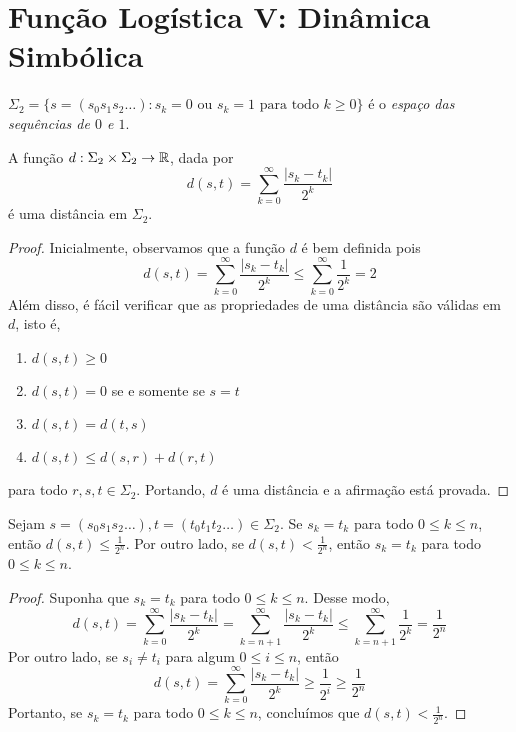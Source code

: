 \section{Função Logística V: Dinâmica Simbólica}

\begin{definition}
$\Sigma_2 = \{s = (s_0s_1s_2\dots) : s_k = 0 \textrm{ ou } s_k = 1 \textrm{ para todo } k\geq 0\}$ é o \textit{espaço das sequências de $0$ e $1$}.
\end{definition}

\begin{proposition}
A função $d: \Sigma_2 \times \Sigma_2 \to \mathbb{R}$, dada por
$$d(s, t) = \sum_{k=0}^{\infty} \frac{|s_k - t_k|}{2^k}$$
é uma distância em $\Sigma_2$.
\end{proposition}

\begin{proof}
Inicialmente, observamos que a função $d$ é bem definida pois
$$d(s, t) = \sum_{k=0}^{\infty} \frac{|s_k - t_k|}{2^k} \leq \sum_{k=0}^{\infty} \frac{1}{2^k} = 2$$
Além disso, é fácil verificar que as propriedades de uma distância são válidas em $d$, isto é,
\begin{enumerate}[label=(\alph*)]
\item $d(s, t) \geq 0$
\item $d(s, t) = 0$ se e somente se $s = t$
\item  $d(s, t) = d(t, s)$
\item $d(s, t) \leq d(s, r) + d(r, t)$
\end{enumerate}
para todo $r, s, t \in \Sigma_2$. Portando, $d$ é uma distância e a afirmação está provada.
\end{proof}

\begin{proposition}
\label{proposicao dinamicasimbolica 1}
Sejam $s = (s_0s_1s_2\dots) , t = (t_0t_1t_2\dots) \in \Sigma_2$. Se $s_k = t_ k$ para todo $0 \leq k \leq n$, então $d(s, t) \leq \frac{1}{2^n}$. Por outro lado, se $d(s, t) < \frac{1}{2^n}$, então $s_k = t_k$ para todo $0 \leq k \leq n$.
\end{proposition}

\begin{proof}
Suponha que $s_k = t_ k$ para todo $0 \leq k \leq n$. Desse modo, $$d(s, t) = \sum_{k=0}^{\infty} \frac{|s_k - t_k|}{2^k} = \sum_{k=n+1}^{\infty} \frac{|s_k - t_k|}{2^k} \leq \sum_{k=n+1}^{\infty} \frac{1}{2^k} = \frac{1}{2^n}$$
Por outro lado, se $s_i \neq t_i$ para algum $0 \leq i \leq n$, então $$d(s, t) = \sum_{k=0}^{\infty} \frac{|s_k - t_k|}{2^k} \geq \frac{1}{2^i} \geq \frac{1}{2^n}$$ Portanto, se $s_k = t_k$ para todo $0 \leq k \leq n$, concluímos que $d(s, t) < \frac{1}{2^n}$.
\end{proof}


